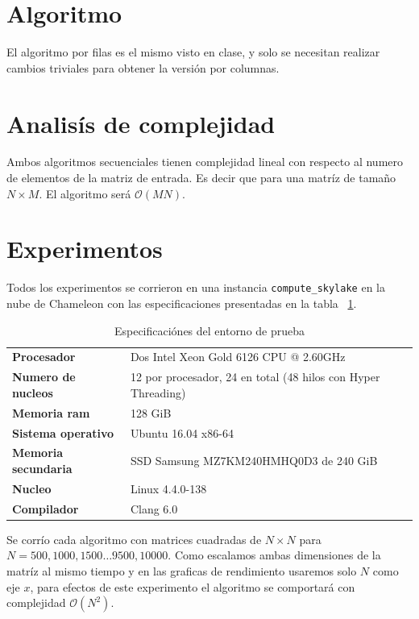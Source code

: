 \documentclass{report}
\begin{document}
\section{Algoritmo}

El algoritmo por filas es el mismo visto en clase, y solo se necesitan
realizar cambios triviales para obtener la versión por columnas.

\section{Analis\'is de complejidad}

Ambos algoritmos secuenciales tienen complejidad lineal con respecto al numero
de elementos de la matriz de entrada. Es decir que para una matr\'iz de tamaño
$N \times M$. El algoritmo ser\'a $\mathcal{O}(MN)$.

\section{Experimentos}

Todos los experimentos se corrieron en una instancia \texttt{compute\_skylake} en la
nube de Chameleon con las especificaciones presentadas en la tabla
~\ref{table:testspecs}.

\begin{table}[H]
  \begin{tabular}{ >{\bf}l l }
  Procesador & Dos Intel Xeon Gold 6126 CPU @ 2.60GHz \\
  Numero de nucleos & 12 por procesador, 24 en total (48 hilos con Hyper Threading) \\
  Memoria ram & 128 GiB \\
  Sistema operativo & Ubuntu 16.04 x86-64 \\
  Memoria secundaria & SSD Samsung MZ7KM240HMHQ0D3 de 240 GiB\\
  Nucleo & Linux 4.4.0-138 \\
  Compilador & Clang 6.0
\end{tabular}
\caption{Especificaciónes del entorno de prueba}
\label{table:testspecs}
\end{table}

Se corr\'io cada algoritmo con matrices cuadradas de $N \times N$  para 
$N = 500, 1000, 1500 \ldots 9500, 10000 $. Como escalamos ambas
dimensiones de la matr\'iz al mismo tiempo y en las graficas de
rendimiento usaremos solo $N$ como eje $x$, para efectos de este experimento
el algoritmo se comportar\'a con complejidad $\mathcal{O}(N^2)$.
\end{document}
